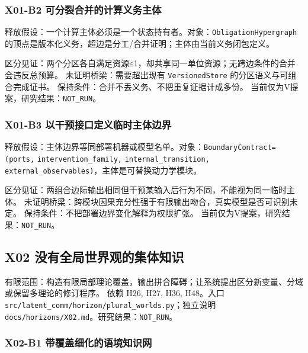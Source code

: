 \documentclass[
  10pt,
]{article}
\begin{document}
\subsubsection{X01-B2
可分裂合并的计算义务主体}\label{x01-b2-ux53efux5206ux88c2ux5408ux5e76ux7684ux8ba1ux7b97ux4e49ux52a1ux4e3bux4f53}

释放假设：一个计算主体必须是一个状态持有者。对象：\nolinkurl{ObligationHypergraph}
的顶点是版本化义务，超边是分工/合并证明；主体由当前义务闭包定义。

区分见证：两个分区各自满足资源≤1，却共享同一单位资源；无跨边条件的合并会违反总预算。
未证明桥梁：需要超出现有 \nolinkurl{VersionedStore}
的分区语义与可组合完成证书。
保持条件：合并不丢义务、不把重复证据计成多份。
当前仅为V提案，研究结果：\nolinkurl{NOT_RUN}。

\subsubsection{X01-B3
以干预接口定义临时主体边界}\label{x01-b3-ux4ee5ux5e72ux9884ux63a5ux53e3ux5b9aux4e49ux4e34ux65f6ux4e3bux4f53ux8fb9ux754c}

释放假设：主体边界等同部署机器或模型名单。对象：\nolinkurl{BoundaryContract=(ports,}
\nolinkurl{intervention_family,} \nolinkurl{internal_transition,}
\nolinkurl{external_observables)}，主体是可替换动力学模块。

区分见证：两组合边际输出相同但干预某输入后行为不同，不能视为同一临时主体。
未证明桥梁：跨模块因果充分性强于有限输出吻合，真实模型是否可识别未定。
保持条件：不把部署边界变化解释为权限扩张。
当前仅为V提案，研究结果：\nolinkurl{NOT_RUN}。

\subsection{X02
没有全局世界观的集体知识}\label{x02-ux6ca1ux6709ux5168ux5c40ux4e16ux754cux89c2ux7684ux96c6ux4f53ux77e5ux8bc6}

有限范围：构造有限局部理论覆盖，输出拼合障碍；让系统提出区分新变量、分域或保留多理论的修订程序。
依赖 H26, H27, H36, H48。入口
{\small\nolinkurl{src/latent_comm/horizon/plural_worlds.py}}；独立说明
{\small\nolinkurl{docs/horizons/X02.md}}。研究结果：\nolinkurl{NOT_RUN}。

\subsubsection{X02-B1
带覆盖细化的语境知识网}\label{x02-b1-ux5e26ux8986ux76d6ux7ec6ux5316ux7684ux8bedux5883ux77e5ux8bc6ux7f51}
\end{document}
